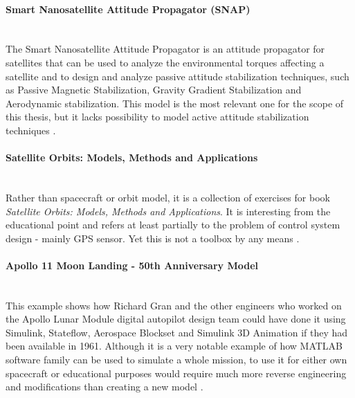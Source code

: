         \paragraph*{Smart Nanosatellite Attitude Propagator (SNAP)}\hspace{0pt}\\
            The Smart Nanosatellite Attitude Propagator is an attitude propagator for satellites that can be used to analyze the environmental torques affecting a satellite and to design and analyze passive attitude stabilization techniques, such as Passive Magnetic Stabilization, Gravity Gradient Stabilization and Aerodynamic stabilization. This model is the most relevant one for the scope of this thesis, but it lacks possibility to model active attitude stabilization techniques \cite{snap}.

        \paragraph*{Satellite Orbits: Models, Methods and Applications}\hspace{0pt}\\
            Rather than spacecraft or orbit model, it is a collection of exercises for book \textit{Satellite Orbits: Models, Methods and Applications}. It is interesting from the educational point and refers at least partially to the problem of control system design - mainly GPS sensor. Yet this is not a toolbox by any means \cite{orbitsaddon}.
        
        \paragraph*{Apollo 11 Moon Landing - 50th Anniversary Model}\hspace{0pt}\\
            This example shows how Richard Gran and the other engineers who worked on the Apollo Lunar Module digital autopilot design team could have done it using Simulink, Stateflow, Aerospace Blockset and Simulink 3D Animation if they had been available in 1961. Although it is a very notable example of how MATLAB software family can be used to simulate a whole mission, to use it for either own spacecraft or educational purposes would require much more reverse engineering and modifications than creating a new model \cite{apollo}. 

